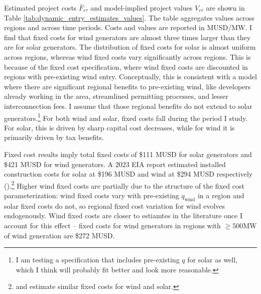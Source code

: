 \documentclass[12pt]{article}
\begin{document}
Estimated project costs $\bar{F}_{r\tau}$ and model-implied project values $V_{r\tau}$ are shown in Table \ref{tab:dynamic_entry_estimates_values}. The table aggregates values across regions and across time periods. Costs and values are reported in MUSD/MW. I find that fixed costs for wind generators are almost three times larger than they are for solar generators. The distribution of fixed costs for solar is almost uniform across regions, whereas wind fixed costs vary significantly across regions. This is because of the fixed cost specification, where wind fixed costs are discounted in regions with pre-existing wind entry. Conceptually, this is consistent with a model where there are significant regional benefits to pre-existing wind, like developers already working in the area, streamlined permitting processes, and lesser interconnection fees. I assume that those regional benefits do not extend to solar generators.\footnote{I am testing a specification that includes pre-existing $q$ for solar as well, which I think will probably fit better and look more reasonable.} For both wind and solar, fixed costs fall during the period I study. For solar, this is driven by sharp capital cost decreases, while for wind it is primarily driven by tax benefits. 

Fixed cost results imply total fixed costs of \$111 MUSD for solar generators and \$421 MUSD for wind generators. A 2023 EIA report estimated installed construction costs for solar at \$196 MUSD and wind at \$294 MUSD respectively (\cite{EIA2025GeneratorConstructionCosts2023}).\footnote{\cite{SeelEtAl2024UtilityScaleSolar} and \cite{WiserEtAl2024LandBasedWind} estimate similar fixed costs for wind and solar.} Higher wind fixed costs are partially due to the structure of the fixed cost parameterization: wind fixed costs vary with pre-existing $q_{\mathrm{wind}}$ in a region and solar fixed costs do not, so regional fixed cost variation for wind evolves endogenously. Wind fixed costs are closer to estiamtes in the literature once I account for this effect -- fixed costs for wind generators in regions with $\geq 500$MW of wind generation are \$272 MUSD. 


\end{document}
